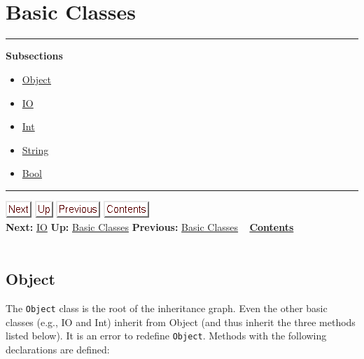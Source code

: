 \documentclass[]{article}
\begin{document}
\section{\\ Basic Classes}

\begin{center}\rule{3in}{0.4pt}\end{center}

\textbf{Subsections}

\begin{itemize}
\itemsep1pt\parskip0pt
\item
  \href{node27.html}{Object}
\item
  \href{node28.html}{IO}
\item
  \href{node29.html}{Int}
\item
  \href{node30.html}{String}
\item
  \href{node31.html}{Bool}
\end{itemize}

\begin{center}\rule{3in}{0.4pt}\end{center}

\href{node28.html}{\includegraphics{next.png}}
\href{node26.html}{\includegraphics{up.png}}
\href{node26.html}{\includegraphics{prev.png}}
\href{node1.html}{\includegraphics{contents.png}} \\ \textbf{Next:}
\href{node28.html}{IO} \textbf{Up:} \href{node26.html}{Basic Classes}
\textbf{Previous:} \href{node26.html}{Basic Classes} ~
\textbf{\href{node1.html}{Contents}} \\ \\

\subsection{Object}

The \texttt{Object} class is the root of the inheritance graph. Even the
other basic classes (e.g., IO and Int) inherit from Object (and thus
inherit the three methods listed below). It is an error to redefine
\texttt{Object}. Methods with the following declarations are defined:
\end{document}
